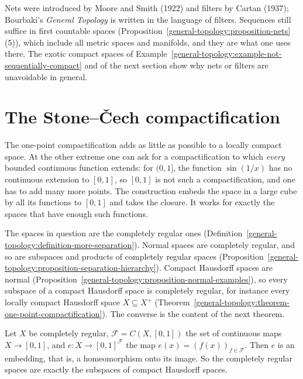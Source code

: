 \begin{remark}\label{general-topology:remark-nets-filters}
Nets were introduced by Moore and Smith (1922) and filters by Cartan (1937); Bourbaki's \emph{General Topology} is written in the language of filters. Sequences still suffice in
first countable spaces (Proposition~\ref{general-topology:proposition-nets}(5)), which include all metric spaces and manifolds, and they are what one uses there. The exotic compact spaces of
Example~\ref{general-topology:example-not-sequentially-compact} and of the next section show why nets or filters are unavoidable in general.
\end{remark}

\section{The Stone--\v{C}ech compactification}\label{general-topology:section-stone-cech}

The one-point compactification adds as little as possible to a locally compact space. At the other extreme one can ask for a compactification to which \emph{every} bounded continuous function
extends: for $(0, 1]$, the function $\sin(1/x)$ has no continuous extension to $[0, 1]$, so $[0, 1]$ is not such a compactification, and one has to add many more points. The construction embeds the space in
a large cube by all its functions to $[0, 1]$ and takes the closure. It works for exactly the spaces that have enough such functions.

The spaces in question are the completely regular ones (Definition~\ref{general-topology:definition-more-separation}). Normal spaces are completely regular, and so are subspaces and products of completely
regular spaces (Proposition~\ref{general-topology:proposition-separation-hierarchy}). Compact Hausdorff spaces are normal (Proposition~\ref{general-topology:proposition-normal-examples}), so every subspace of
a compact Hausdorff space is completely regular, for instance every locally compact Hausdorff space $X \subseteq X^+$ (Theorem~\ref{general-topology:theorem-one-point-compactification}). The converse is the
content of the next theorem.

\begin{theorem}\label{general-topology:theorem-cube-embedding}
Let $X$ be completely regular, $\mathcal{F} = C(X, [0, 1])$ the set of continuous maps $X \to [0, 1]$, and $e \colon X \to [0, 1]^{\mathcal{F}}$ the map $e(x) = (f(x))_{f \in \mathcal{F}}$. Then $e$ is an
embedding, that is, a homeomorphism onto its image. So the completely regular spaces are exactly the subspaces of compact Hausdorff spaces.
\end{theorem}

